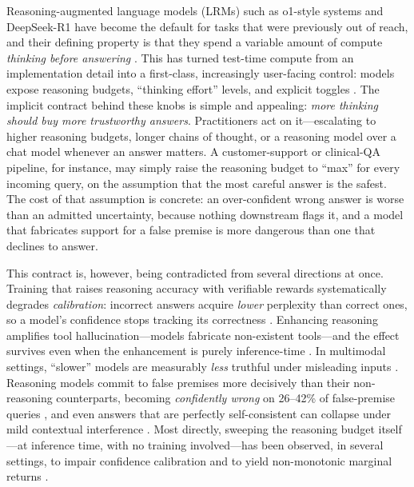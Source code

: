 \documentclass[11pt]{article}
\begin{document}
Reasoning-augmented language models (LRMs) such as o1-style systems and
DeepSeek-R1 have become the default for tasks that were previously out of
reach, and their defining property is that they spend a variable amount of
compute \emph{thinking before answering} \citep{Guo2025DeepSeekR1}.
This has turned test-time compute from an implementation detail into a
first-class, increasingly user-facing control: models expose reasoning
budgets, ``thinking effort'' levels, and explicit toggles
\citep{Muennighoff2025s1, Snell2024TestTimeCompute}.
The implicit contract behind these knobs is simple and appealing: \emph{more
thinking should buy more trustworthy answers}.
Practitioners act on it---escalating to higher reasoning budgets, longer
chains of thought, or a reasoning model over a chat model whenever an answer
matters.
A customer-support or clinical-QA pipeline, for instance, may simply raise the
reasoning budget to ``max'' for every incoming query, on the assumption that
the most careful answer is the safest.
The cost of that assumption is concrete: an over-confident wrong answer is
worse than an admitted uncertainty, because nothing downstream flags it, and a
model that fabricates support for a false premise is more dangerous than one
that declines to answer.

This contract is, however, being contradicted from several directions at
once.
Training that raises reasoning accuracy with verifiable rewards
systematically degrades \emph{calibration}: incorrect answers acquire
\emph{lower} perplexity than correct ones, so a model's confidence stops
tracking its correctness \citep{Wang2026CAPO, Jin2025Entropy}.
Enhancing reasoning amplifies tool hallucination---models fabricate
non-existent tools---and the effect survives even when the enhancement is
purely inference-time \citep{Yin2025ReasoningTrap}.
In multimodal settings, ``slower'' models are measurably \emph{less} truthful
under misleading inputs \citep{Fang2025Slower}.
Reasoning models commit to false premises more decisively than their
non-reasoning counterparts, becoming \emph{confidently wrong} on 26--42\% of
false-premise queries \citep{Sathyanathan2025Presuppositions}, and even
answers that are perfectly self-consistent can collapse under mild
contextual interference \citep{Xu2026IllusionConfidence}.
Most directly, sweeping the reasoning budget itself---at inference time, with
no training involved---has been observed, in several settings, to impair
confidence calibration \citep{DontThinkTwice2025} and to yield non-monotonic
marginal returns \citep{WhenMoreThinkingHurts2026}.
\end{document}

